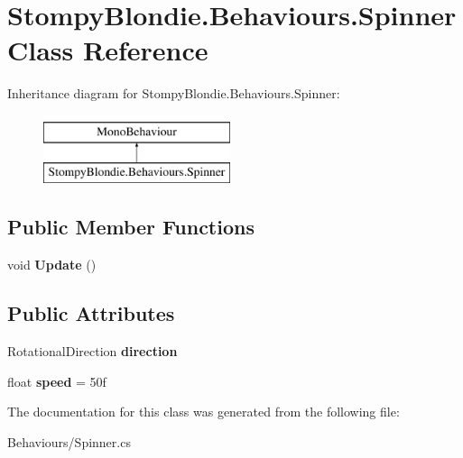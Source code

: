 \hypertarget{class_stompy_blondie_1_1_behaviours_1_1_spinner}{}\section{Stompy\+Blondie.\+Behaviours.\+Spinner Class Reference}
\label{class_stompy_blondie_1_1_behaviours_1_1_spinner}
Inheritance diagram for Stompy\+Blondie.\+Behaviours.\+Spinner\+:\begin{figure}[H]
\begin{center}
\leavevmode
\includegraphics[height=2.000000cm]{class_stompy_blondie_1_1_behaviours_1_1_spinner}
\end{center}
\end{figure}
\subsection*{Public Member Functions}
\begin{DoxyCompactItemize}
\item 
\mbox{\label{class_stompy_blondie_1_1_behaviours_1_1_spinner_a33ccb86c5abbeec77a4039cf8be1dd64}} 
void {\bfseries Update} ()
\end{DoxyCompactItemize}
\subsection*{Public Attributes}
\begin{DoxyCompactItemize}
\item 
\mbox{\label{class_stompy_blondie_1_1_behaviours_1_1_spinner_a8443ae6a767b91a6d398416f08fe69be}} 
Rotational\+Direction {\bfseries direction}
\item 
\mbox{\label{class_stompy_blondie_1_1_behaviours_1_1_spinner_a34128a5d487db9bf69d6e9aa84ec2130}} 
float {\bfseries speed} = 50f
\end{DoxyCompactItemize}


The documentation for this class was generated from the following file\+:\begin{DoxyCompactItemize}
\item 
Behaviours/Spinner.\+cs\end{DoxyCompactItemize}

